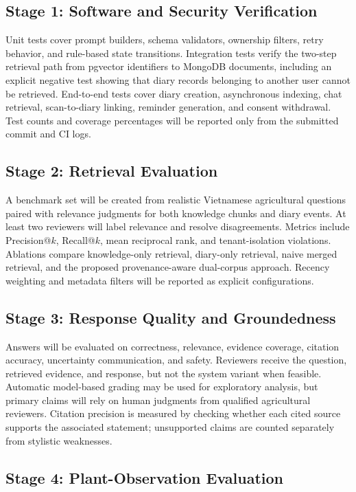 \documentclass[conference]{IEEEtran}
\begin{document}
\subsection{Stage 1: Software and Security Verification}

Unit tests cover prompt builders, schema validators, ownership filters, retry behavior, and rule-based state transitions. Integration tests verify the two-step retrieval path from pgvector identifiers to MongoDB documents, including an explicit negative test showing that diary records belonging to another user cannot be retrieved. End-to-end tests cover diary creation, asynchronous indexing, chat retrieval, scan-to-diary linking, reminder generation, and consent withdrawal. Test counts and coverage percentages will be reported only from the submitted commit and CI logs.

\subsection{Stage 2: Retrieval Evaluation}

A benchmark set will be created from realistic Vietnamese agricultural questions paired with relevance judgments for both knowledge chunks and diary events. At least two reviewers will label relevance and resolve disagreements. Metrics include Precision@$k$, Recall@$k$, mean reciprocal rank, and tenant-isolation violations. Ablations compare knowledge-only retrieval, diary-only retrieval, naive merged retrieval, and the proposed provenance-aware dual-corpus approach. Recency weighting and metadata filters will be reported as explicit configurations.

\subsection{Stage 3: Response Quality and Groundedness}

Answers will be evaluated on correctness, relevance, evidence coverage, citation accuracy, uncertainty communication, and safety. Reviewers receive the question, retrieved evidence, and response, but not the system variant when feasible. Automatic model-based grading may be used for exploratory analysis, but primary claims will rely on human judgments from qualified agricultural reviewers. Citation precision is measured by checking whether each cited source supports the associated statement; unsupported claims are counted separately from stylistic weaknesses.

\subsection{Stage 4: Plant-Observation Evaluation}
\end{document}
